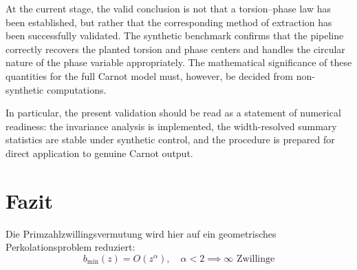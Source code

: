 \documentclass[11pt,a4paper]{article}
\begin{document}
	At the current stage, the valid conclusion is not that a torsion--phase law has been established, but rather that the corresponding method of extraction has been successfully validated. The synthetic benchmark confirms that the pipeline correctly recovers the planted torsion and phase centers and handles the circular nature of the phase variable appropriately. The mathematical significance of these quantities for the full Carnot model must, however, be decided from non-synthetic computations.
	
		In particular, the present validation should be read as a statement of numerical readiness: the invariance analysis is implemented, the width-resolved summary statistics are stable under synthetic control, and the procedure is prepared for direct application to genuine Carnot output.
	
	\section{Fazit}
	Die Primzahlzwillingsvermutung wird hier auf ein geometrisches Perkolationsproblem reduziert:
	\begin{equation}
		\boxed{b_{\min}(z) = O(z^\alpha), \quad \alpha < 2 \implies \infty \text{ Zwillinge}}
	\end{equation}
	
	
	
\end{document}
